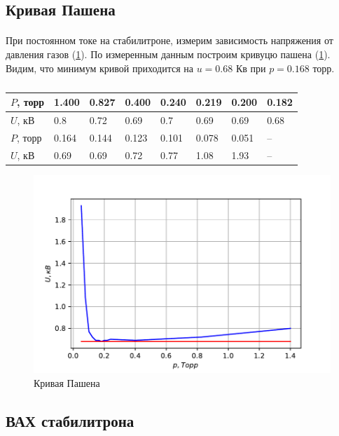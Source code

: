 \documentclass[a4paper,12pt]{article} %
\begin{document}
\subsection{Кривая Пашена}

\paragraph{} При постоянном токе на стабилитроне, измерим зависимость напряжения от давления газов (\ref{fig:pash}). По измеренным данным построим кривуцю пашена (\ref{fig:pash}). Видим, что минимум кривой приходится на $u = 0.68$ Кв при $p= 0.168$ торр.

\begin{table}[h]
\centering
\begin{tabular}{|l|l|l|l|l|l|l|l|}
\hline
$P$, торр & 1.400 & 0.827 & 0.400 & 0.240 & 0.219 & 0.200 & 0.182 \\ \hline
$U$, кВ   & 0.8   & 0.72  & 0.69  & 0.7   & 0.69  & 0.69  & 0.68  \\ \hline
$P$, торр & 0.164 & 0.144 & 0.123 & 0.101 & 0.078 & 0.051 & --    \\ \hline
$U$, кВ   & 0.69  & 0.69  & 0.72  & 0.77  & 1.08  & 1.93  & --    \\ \hline
\end{tabular}
\caption{}
\label{tab:pash}
\end{table}

\begin{figure}[h]
\centering
\includegraphics[width=\textwidth]{un-pashe.pdf}
\caption{Кривая Пашена}
\label{fig:pash}
\end{figure}


\subsection{ВАХ стабилитрона}
\end{document}

